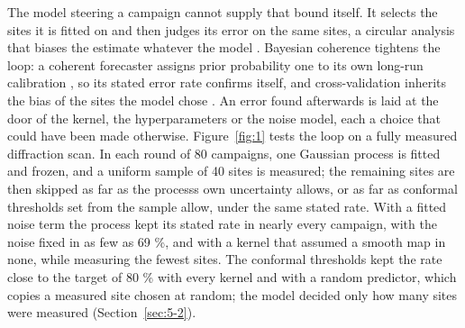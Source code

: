 \documentclass{iopjournal}
\begin{document}
The model steering a campaign cannot supply that bound itself. It selects the sites it is fitted on and then judges its error on the same sites, a circular analysis that biases the estimate whatever the model \cite{Kriegeskorte2009}. Bayesian coherence tightens the loop: a coherent forecaster assigns prior probability one to its own long-run calibration \cite{Dawid1982}, so its stated error rate confirms itself, and cross-validation inherits the bias of the sites the model chose \cite{Barber2021,Fannjiang2022}. An error found afterwards is laid at the door of the kernel, the hyperparameters or the noise model, each a choice that could have been made otherwise. Figure~\ref{fig:1} tests the loop on a fully measured diffraction scan. In each round of 80 campaigns, one Gaussian process is fitted and frozen, and a uniform sample of 40 sites is measured; the remaining sites are then skipped as far as the process\textquotesingle s own uncertainty allows, or as far as conformal thresholds set from the sample allow, under the same stated rate. With a fitted noise term the process kept its stated rate in nearly every campaign, with the noise fixed in as few as 69 \%, and with a kernel that assumed a smooth map in none, while measuring the fewest sites. The conformal thresholds kept the rate close to the target of 80 \% with every kernel and with a random predictor, which copies a measured site chosen at random; the model decided only how many sites were measured (Section~\ref{sec:5-2}).
\end{document}
